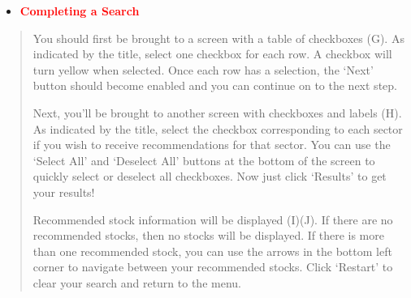 \documentclass[fontsize=12pt]{article}
\begin{document}
\newpage
\begin{itemize}
\item
\textbf{\textcolor{red}{Completing a Search}}
\end{itemize}
\begin{quote}
\noindent
You should first be brought to a screen with a table of checkboxes (G). As indicated by the title, select one checkbox for each row. A checkbox will turn yellow when selected. Once each row has a selection, the ‘Next’ button should become enabled and you can continue on to the next step.

Next, you’ll be brought to another screen with checkboxes and labels (H). As indicated by the title, select the checkbox corresponding to each sector if you wish to receive recommendations for that sector. You can use the ‘Select All’ and ‘Deselect All’ buttons at the bottom of the screen to quickly select or deselect all checkboxes. Now just click ‘Results’ to get your results!

Recommended stock information will be displayed (I)(J). If there are no recommended stocks, then no stocks will be displayed. If there is more than one recommended stock, you can use the arrows in the bottom left corner to navigate between your recommended stocks. Click ‘Restart’ to clear your search and return to the menu.

\end{quote}
\end{document}
